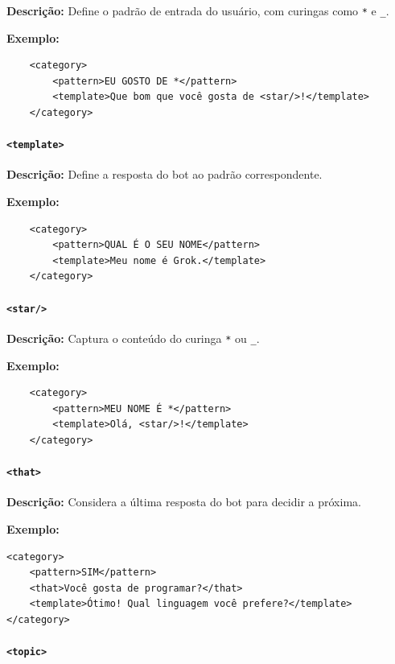 \documentclass[a4paper,oneside]{book}
\begin{document}
\textbf{Descrição:} Define o padrão de entrada do usuário, com curingas como \texttt{*} e \texttt{\_}. 

\textbf{Exemplo:}

\begin{verbatim}
	<category>
		<pattern>EU GOSTO DE *</pattern>
		<template>Que bom que você gosta de <star/>!</template>
	</category>
\end{verbatim}

\paragraph{\texttt{<template>}} 

\textbf{Descrição:} Define a resposta do bot ao padrão correspondente. 

\textbf{Exemplo:}

\begin{verbatim}
	<category>
		<pattern>QUAL É O SEU NOME</pattern>
		<template>Meu nome é Grok.</template>
	</category> 
\end{verbatim}

\paragraph{\texttt{<star/>}} 

\textbf{Descrição:} Captura o conteúdo do curinga \texttt{*} ou \texttt{\_}. 

\textbf{Exemplo:}

\begin{verbatim}
	<category>
		<pattern>MEU NOME É *</pattern>
		<template>Olá, <star/>!</template>
	</category>
\end{verbatim}

\paragraph{\texttt{<that>}} 

\textbf{Descrição:} Considera a última resposta do bot para decidir a próxima. 

\textbf{Exemplo:}

\begin{verbatim}
<category>
	<pattern>SIM</pattern>
	<that>Você gosta de programar?</that>
	<template>Ótimo! Qual linguagem você prefere?</template>
</category>
\end{verbatim}

\paragraph{\texttt{<topic>}} 
\end{document}

